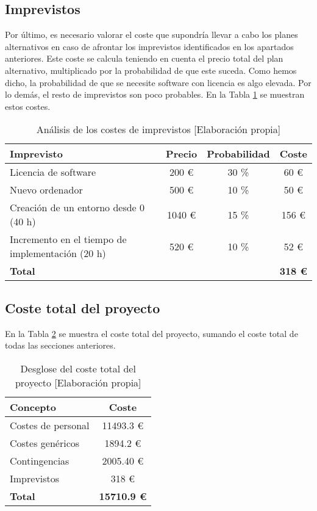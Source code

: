 \subsection{Imprevistos}

Por último, es necesario valorar el coste que supondría llevar a cabo los planes alternativos en caso de afrontar los imprevistos identificados en los apartados anteriores. Este coste se calcula teniendo en cuenta el precio total del plan alternativo, multiplicado por la probabilidad de que este suceda. Como hemos dicho, la probabilidad de que se necesite software con licencia es algo elevada. Por lo demás, el resto de imprevistos son poco probables. En la Tabla \ref{tab:imprevistos} se muestran estos costes.
\begin{table}[ht]
    \begin{center}
        \begin{tabular}{ l  c  c  c }
        \textbf{Imprevisto} & \textbf{Precio} & \textbf{Probabilidad} & \textbf{Coste} \\
        \hline
        Licencia de software & 200 € & 30 \% & 60 € \\
        Nuevo ordenador & 500 € & 10 \%  & 50 € \\
        Creación de un entorno desde 0 (40 h) & 1040 € & 15 \% & 156 €\\
        Incremento en el tiempo de implementación (20 h) & 520 € & 10 \% & 52 € \\
        \hline
        \textbf{Total} & & & \textbf{318 €} \\
        \end{tabular}
        \caption{Análisis de los costes de imprevistos [Elaboración propia]}
        \label{tab:imprevistos}
    \end{center}
\end{table}

\subsection{Coste total del proyecto}
En la Tabla \ref{tab:coste_total} se muestra el coste total del proyecto, sumando el coste total de todas las secciones anteriores.
\begin{table}[h]
    \begin{center}
        \begin{tabular}{ l  c }
        \textbf{Concepto} & \textbf{Coste} \\
        \hline
        Costes de personal      & 11493.3 € \\
        Costes genéricos        & 1894.2 €  \\
        Contingencias           & 2005.40 € \\
        Imprevistos             & 318 €  \\
        \hline
        \textbf{Total} & \textbf{15710.9 €} \\
        \end{tabular}
        \caption{Desglose del coste total del proyecto [Elaboración propia]}
        \label{tab:coste_total}
    \end{center}
\end{table}

